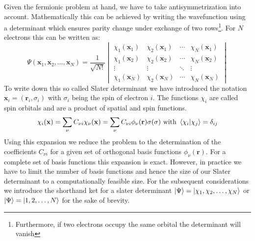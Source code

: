 Given the fermionic problem at hand, we have to take antisymmetrization into account. Mathematically this can be achieved by writing the wavefunction using a determinant which ensures parity change under exchange of two rows\footnote{Furthermore, if two electrons occupy the same orbital the determinant will vanish}. For $N$ electrons this can be written as:
\begin{equation}
    \Psi(\mathbf{x}_1, \mathbf{x}_2, \ldots, \mathbf{x}_N) = \frac{1}{\sqrt{N!}}
    \begin{vmatrix}
    \chi_1(\mathbf{x}_1) & \chi_2(\mathbf{x}_1) & \cdots & \chi_N(\mathbf{x}_1) \\
    \chi_1(\mathbf{x}_2) & \chi_2(\mathbf{x}_2) & \cdots & \chi_N(\mathbf{x}_2) \\
    \vdots & \vdots & \ddots & \vdots \\
    \chi_1(\mathbf{x}_N) & \chi_2(\mathbf{x}_N) & \cdots & \chi_N(\mathbf{x}_N)
    \end{vmatrix}
\end{equation}
To write down this so called Slater determinant we have introduced the notation $\mathbf{x}_i = (\mathbf{r}_i, \sigma_i)$ with $\sigma_i$ being the spin of electron $i$. The functions $\chi_i$ are called spin orbitals and are a product of spatial and spin functions. 
\begin{equation}
    \label{eq:spin_orbital_expansion}
    \chi_i(\mathbf{x}) = \sum_{\nu} C_{\nu i} \chi_\nu(\mathbf{x}) = \sum_{\nu} C_{\nu i} \phi_\nu(\mathbf{r}) \sigma(\sigma) \text{ with } \bra{\chi_i}\ket{\chi_j} = \delta_{ij}
\end{equation}
Using this expansion we reduce the problem to the determination of the coefficients $C_{\nu i}$ for a given set of orthogonal basis functions $\phi_\nu(\mathbf{r})$. For a complete set of basis functions this expansion is exact. However, in practice we have to limit the number of basis functions and hence the size of our Slater determinant to a computationally feasible size. For the subsequent considerations we introduce the shorthand ket for a slater determinant $\ket{\Psi} = \ket{\chi_1, \chi_2, \ldots, \chi_N}$ or $\ket{\Psi} = \ket{1, 2, \ldots, N}$ for the sake of brevity.

